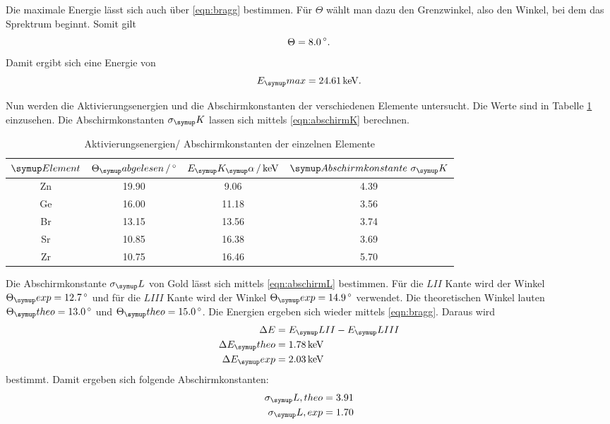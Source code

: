 Die maximale Energie lässt sich auch über \eqref{eqn:bragg} bestimmen. Für $\Theta$
wählt man dazu den Grenzwinkel, also den Winkel, bei dem das Sprektrum beginnt.
Somit gilt
\begin{equation}
  \Theta = 8.0 \,\si{\degree}.
\end{equation}
Damit ergibt sich eine Energie von
\begin{equation}
  E_\su{max} = 24.61 \keV.
\end{equation}

Nun werden die Aktivierungsenergien und die Abschirmkonstanten
der verschiedenen Elemente untersucht. Die
Werte sind in Tabelle \ref{tab:Energie} einzusehen. Die Abschirmkonstanten $\sigma_\su{K}$
lassen sich mittels \eqref{eqn:abschirmK} berechnen.
\begin{table}
  \centering
  \begin{tabular}{c c c c}
    \toprule
    $\su{Element}$ & $\Theta_\su{abgelesen} \,/\dgr$ & $E_\su{K_\su{\alpha}}\,/ \keV$ & $\su{Abschirmkonstante}\,\,\sigma_\su{K}$\\
    \midrule
    Zn & 19.90 &  9.06 & 4.39   \\
    Ge & 16.00 & 11.18 & 3.56   \\
    Br & 13.15 & 13.56 & 3.74   \\
    Sr & 10.85 & 16.38 & 3.69   \\
    Zr & 10.75 & 16.46 & 5.70   \\
    \bottomrule
  \end{tabular}
  \caption{Aktivierungsenergien/ Abschirmkonstanten der einzelnen Elemente}
  \label{tab:Energie}
\end{table}
Die Abschirmkonstante $\sigma_\su{L}$
von Gold lässt sich mittels \eqref{eqn:abschirmL} bestimmen.
Für die $LII$ Kante wird der Winkel $\Theta_\su{exp} = 12.7 \dgr$ und für die $LIII$ Kante
wird der Winkel $\Theta_\su{exp} = 14.9 \dgr$ verwendet. Die theoretischen Winkel lauten
$\Theta_\su{theo} = 13.0 \dgr$ und $\Theta_\su{theo} = 15.0 \dgr$.
Die Energien ergeben sich wieder mittels \eqref{eqn:bragg}. Daraus wird
\begin{align*}
  \Delta E &= E_\su{LII} - E_\su{LIII} \\
  \Delta E_\su{theo} &= 1.78 \keV \\
  \Delta E_\su{exp} &= 2.03 \keV \\
\end{align*}
bestimmt.
Damit ergeben sich folgende Abschirmkonstanten:
\begin{align*}
  \sigma_\su{L, theo} &= 3.91  \\
  \sigma_\su{L, exp} &= 1.70 \\
\end{align*}

